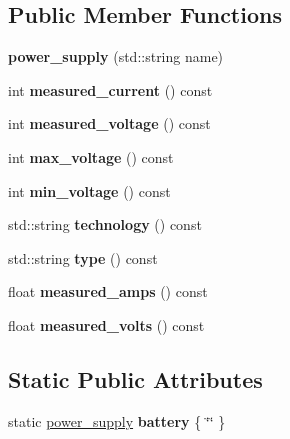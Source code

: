 \subsection*{Public Member Functions}
\begin{DoxyCompactItemize}
\item 
\mbox{\label{classev3dev_1_1power__supply_a607ab3c01fe9c71e1592cd48261aca53}} 
{\bfseries power\+\_\+supply} (std\+::string name)
\item 
\mbox{\label{classev3dev_1_1power__supply_ac0ff23172b12729b87f0529ccda12c5c}} 
int {\bfseries measured\+\_\+current} () const
\item 
\mbox{\label{classev3dev_1_1power__supply_aa8797dd4fd38610a9b5007aba59ca644}} 
int {\bfseries measured\+\_\+voltage} () const
\item 
\mbox{\label{classev3dev_1_1power__supply_a3387be0ebaba4b4acca1804c601877ab}} 
int {\bfseries max\+\_\+voltage} () const
\item 
\mbox{\label{classev3dev_1_1power__supply_a81f0fd5f49b72607024b1ef9e8cc7cdc}} 
int {\bfseries min\+\_\+voltage} () const
\item 
\mbox{\label{classev3dev_1_1power__supply_a52fec08b8fd6c9c50937162ecf01a0ea}} 
std\+::string {\bfseries technology} () const
\item 
\mbox{\label{classev3dev_1_1power__supply_a030ad70f67cbae46f4ab5f235b3d68f0}} 
std\+::string {\bfseries type} () const
\item 
\mbox{\label{classev3dev_1_1power__supply_ace4bb930dec4abc874f1ca8204d78daa}} 
float {\bfseries measured\+\_\+amps} () const
\item 
\mbox{\label{classev3dev_1_1power__supply_a50a62222eec99131d856701c7ef4bce7}} 
float {\bfseries measured\+\_\+volts} () const
\end{DoxyCompactItemize}
\subsection*{Static Public Attributes}
\begin{DoxyCompactItemize}
\item 
\mbox{\label{classev3dev_1_1power__supply_a1266e7af590c5acd6f5f0589a33459f6}} 
static \hyperlink{classev3dev_1_1power__supply}{power\+\_\+supply} {\bfseries battery} \{ \char`\"{}\char`\"{} \}
\end{DoxyCompactItemize}
